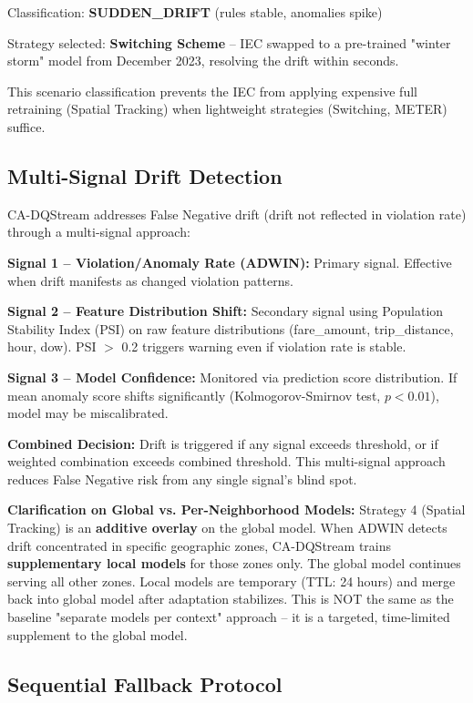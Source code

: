 Classification: \textbf{SUDDEN\_DRIFT} (rules stable, anomalies spike)

Strategy selected: \textbf{Switching Scheme} -- IEC swapped to a pre-trained "winter storm" model from December 2023, resolving the drift within seconds.

This scenario classification prevents the IEC from applying expensive full retraining (Spatial Tracking) when lightweight strategies (Switching, METER) suffice.

\subsection{Multi-Signal Drift Detection}

CA-DQStream addresses False Negative drift (drift not reflected in violation rate) through a multi-signal approach:

\textbf{Signal 1 -- Violation/Anomaly Rate (ADWIN):} Primary signal. Effective when drift manifests as changed violation patterns.

\textbf{Signal 2 -- Feature Distribution Shift:} Secondary signal using Population Stability Index (PSI) on raw feature distributions (fare\_amount, trip\_distance, hour, dow). PSI $>$ 0.2 triggers warning even if violation rate is stable.

\textbf{Signal 3 -- Model Confidence:} Monitored via prediction score distribution. If mean anomaly score shifts significantly (Kolmogorov-Smirnov test, $p<0.01$), model may be miscalibrated.

\textbf{Combined Decision:} Drift is triggered if any signal exceeds threshold, or if weighted combination exceeds combined threshold. This multi-signal approach reduces False Negative risk from any single signal's blind spot.

\textbf{Clarification on Global vs. Per-Neighborhood Models:} Strategy 4 (Spatial Tracking) is an \textbf{additive overlay} on the global model. When ADWIN detects drift concentrated in specific geographic zones, CA-DQStream trains \textbf{supplementary local models} for those zones only. The global model continues serving all other zones. Local models are temporary (TTL: 24 hours) and merge back into global model after adaptation stabilizes. This is NOT the same as the baseline "separate models per context" approach -- it is a targeted, time-limited supplement to the global model.

\subsection{Sequential Fallback Protocol}

